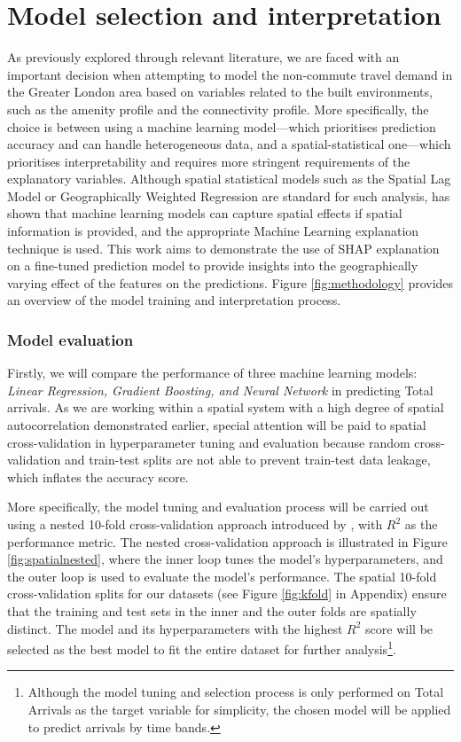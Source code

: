 \pagebreak[4] %
\section{Model selection and interpretation}

As previously explored through relevant literature, we are faced with an important decision when attempting to model the non-commute travel demand in the Greater London area based on variables related to the built environments, such as the amenity profile and the connectivity profile. More specifically, the choice is between using a machine learning model---which prioritises prediction accuracy and can handle heterogeneous data, and a spatial-statistical one---which prioritises interpretability and requires more stringent requirements of the explanatory variables. Although spatial statistical models such as the Spatial Lag Model or Geographically Weighted Regression are standard for such analysis, \citet{liExtractingSpatialEffects2022} has shown that machine learning models can capture spatial effects if spatial information is provided, and the appropriate Machine Learning explanation technique is used. This work aims to demonstrate the use of SHAP explanation on a fine-tuned prediction model to provide insights into the geographically varying effect of the features on the predictions. Figure \ref{fig:methodology} provides an overview of the model training and interpretation process.

\subsubsection*{Model evaluation}
Firstly, we will compare the performance of three machine learning models: \textit{Linear Regression, Gradient Boosting, and Neural Network} in predicting Total arrivals. As we are working within a spatial system with a high degree of spatial autocorrelation demonstrated earlier, special attention will be paid to spatial cross-validation in hyperparameter tuning and evaluation because random cross-validation and train-test splits are not able to prevent train-test data leakage, which inflates the accuracy score. 

More specifically, the model tuning and evaluation process will be carried out using a nested 10-fold cross-validation approach introduced by \citet{schratzPerformanceEvaluationHyperparameter2018}, with $R^2$ as the performance metric. The nested cross-validation approach is illustrated in Figure \ref{fig:spatialnested}, where the inner loop tunes the model's hyperparameters, and the outer loop is used to evaluate the model's performance. The spatial 10-fold cross-validation splits for our datasets (see Figure \ref{fig:kfold} in Appendix) ensure that the training and test sets in the inner and the outer folds are spatially distinct. The model and its hyperparameters with the highest $R^2$ score will be selected as the best model to fit the entire dataset for further analysis\footnote{Although the model tuning and selection process is only performed on Total Arrivals as the target variable for simplicity, the chosen model will be applied to predict arrivals by time bands.}.

